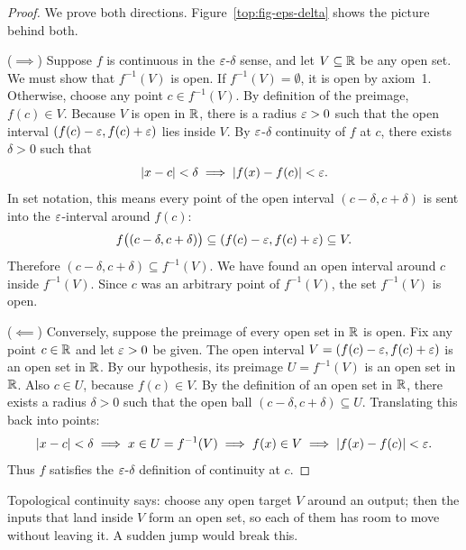 \begin{proof}
We prove both directions. Figure~\ref{top:fig-eps-delta} shows the picture behind both.

($\implies$) Suppose $f$ is continuous in the $\varepsilon$-$\delta$ sense, and let $V \subseteq \mathbb{R}$ be any open set. We must show that $f^{-1}(V)$ is open. If $f^{-1}(V) = \emptyset$, it is open by axiom~1. Otherwise, choose any point $c \in f^{-1}(V)$. By definition of the preimage, $f(c) \in V$. Because $V$ is open in $\mathbb{R}$, there is a radius $\varepsilon > 0$ such that the open interval $(f(c) - \varepsilon, f(c) + \varepsilon)$ lies inside $V$. By $\varepsilon$-$\delta$ continuity of $f$ at $c$, there exists $\delta > 0$ such that
\[
|x - c| < \delta \implies |f(x) - f(c)| < \varepsilon.
\]
In set notation, this means every point of the open interval $(c - \delta, c + \delta)$ is sent into the $\varepsilon$-interval around $f(c)$:
\[
f\bigl((c - \delta, c + \delta)\bigr) \subseteq (f(c) - \varepsilon, f(c) + \varepsilon) \subseteq V.
\]
Therefore $(c - \delta, c + \delta) \subseteq f^{-1}(V)$. We have found an open interval around $c$ inside $f^{-1}(V)$. Since $c$ was an arbitrary point of $f^{-1}(V)$, the set $f^{-1}(V)$ is open.

($\impliedby$) Conversely, suppose the preimage of every open set in $\mathbb{R}$ is open. Fix any point $c \in \mathbb{R}$ and let $\varepsilon > 0$ be given. The open interval $V = (f(c) - \varepsilon, f(c) + \varepsilon)$ is an open set in $\mathbb{R}$. By our hypothesis, its preimage $U = f^{-1}(V)$ is an open set in $\mathbb{R}$. Also $c \in U$, because $f(c) \in V$. By the definition of an open set in $\mathbb{R}$, there exists a radius $\delta > 0$ such that the open ball $(c - \delta, c + \delta) \subseteq U$. Translating this back into points:
\[
|x - c| < \delta \implies x \in U = f^{-1}(V) \implies f(x) \in V \implies |f(x) - f(c)| < \varepsilon.
\]
Thus $f$ satisfies the $\varepsilon$-$\delta$ definition of continuity at $c$.
\end{proof}

\begin{intuitionbox}
Topological continuity says: choose any open target $V$ around an output; then the inputs that land inside $V$ form an open set, so each of them has room to move without leaving it. A sudden jump would break this.
\end{intuitionbox}

